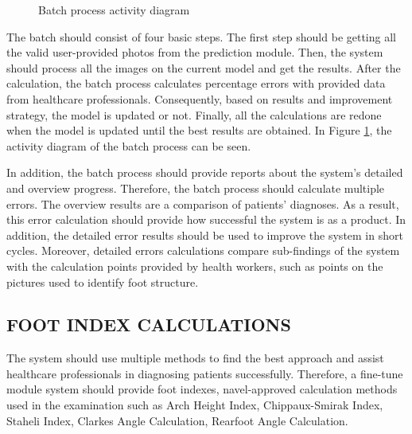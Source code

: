 \begin{figure}[htbp]
\centering
{}
\caption{Batch process activity diagram}
\label{fig:BatchProcessActivityDiagram}
\end{figure}

The batch should consist of four basic steps. The first step should be getting all the valid user-provided photos from the prediction module. Then, the system should process all the images on the current model and get the results. After the calculation, the batch process calculates percentage errors with provided data from healthcare professionals. Consequently, based on results and improvement strategy, the model is updated or not. Finally, all the calculations are redone when the model is updated until the best results are obtained. In Figure \ref{fig:BatchProcessActivityDiagram}, the activity diagram of the batch process can be seen.

In addition, the batch process should provide reports about the system's detailed and overview progress. Therefore, the batch process should calculate multiple errors. The overview results are a comparison of patients' diagnoses. As a result, this error calculation should provide how successful the system is as a product. In addition, the detailed error results should be used to improve the system in short cycles. Moreover, detailed errors calculations compare sub-findings of the system with the calculation points provided by health workers, such as points on the pictures used to identify foot structure. 

\subsection{ FOOT INDEX CALCULATIONS }

The system should use multiple methods to find the best approach and assist healthcare professionals in diagnosing patients successfully. Therefore, a fine-tune module system should provide foot indexes, navel-approved calculation methods used in the examination such as Arch Height Index, Chippaux-Smirak Index, Staheli Index, Clarkes Angle Calculation, Rearfoot Angle Calculation. 

